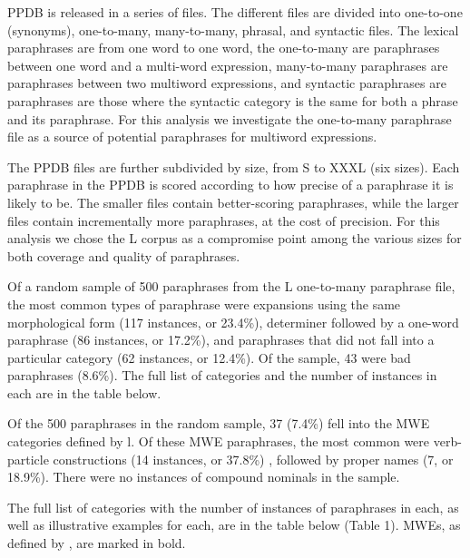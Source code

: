 \documentclass[11pt]{article}
\begin{document}
PPDB is released in a series of files. The different files are divided into one-to-one (synonyms), one-to-many, many-to-many, phrasal, and syntactic files. The lexical paraphrases are from one word to one word, the one-to-many are paraphrases between one word and a multi-word expression, many-to-many paraphrases are paraphrases between two multiword expressions, and syntactic paraphrases are paraphrases are those where the syntactic category is the same for both a phrase and its paraphrase. For this analysis we investigate the one-to-many paraphrase file as a source of potential paraphrases for multiword expressions.

The PPDB files are further subdivided by size, from S to XXXL (six sizes). Each paraphrase in the PPDB is scored according to how precise of a paraphrase it is likely to be. The smaller files contain better-scoring paraphrases, while the larger files contain incrementally more paraphrases, at the cost of precision. For this analysis we chose the L corpus as a compromise point among the various sizes for both coverage and quality of paraphrases.

Of a random sample of 500 paraphrases from the L one-to-many paraphrase file, the most common types of paraphrase were expansions using the same morphological form (117 instances, or 23.4\%), determiner followed by a one-word paraphrase (86 instances, or 17.2\%), and paraphrases that did not fall into a particular category (62 instances, or 12.4\%). Of the sample, 43 were bad paraphrases (8.6\%). The full list of categories and the number of instances in each are in the table below.  

Of the 500 paraphrases in the random sample, 37 (7.4\%) fell into the MWE categories defined by l. Of these MWE paraphrases, the most common were verb-particle constructions (14 instances, or 37.8\%) , followed by proper names (7, or 18.9\%). There were no instances of compound nominals in the sample.

The full list of categories with the number of instances of paraphrases in each, as well as illustrative examples for each, are in the table below (Table 1). MWEs, as defined by , are marked in bold. 
\end{document}
